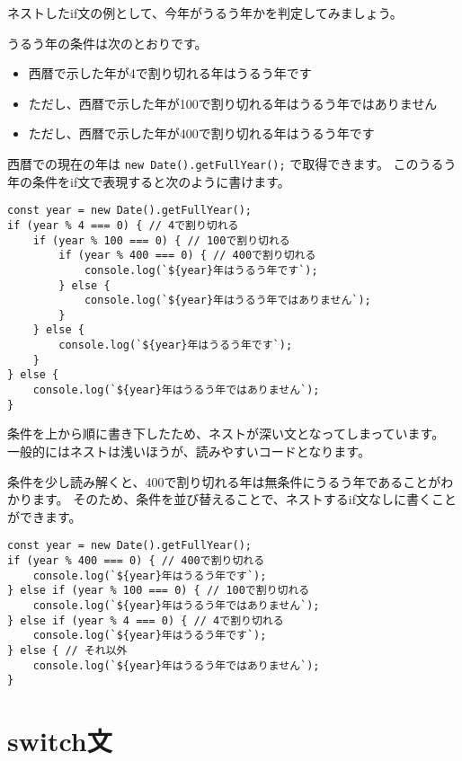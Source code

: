 ネストしたif文の例として、今年がうるう年かを判定してみましょう。

うるう年の条件は次のとおりです。

\begin{itemize}
\item
  西暦で示した年が4で割り切れる年はうるう年です
\item
  ただし、西暦で示した年が100で割り切れる年はうるう年ではありません
\item
  ただし、西暦で示した年が400で割り切れる年はうるう年です
\end{itemize}

西暦での現在の年は \texttt{new Date().getFullYear();}
で取得できます。
このうるう年の条件をif文で表現すると次のように書けます。

\begin{lstlisting}
const year = new Date().getFullYear();
if (year % 4 === 0) { // 4で割り切れる
    if (year % 100 === 0) { // 100で割り切れる
        if (year % 400 === 0) { // 400で割り切れる
            console.log(`${year}年はうるう年です`);
        } else {
            console.log(`${year}年はうるう年ではありません`);
        }
    } else {
        console.log(`${year}年はうるう年です`);
    }
} else {
    console.log(`${year}年はうるう年ではありません`);
}
\end{lstlisting}

条件を上から順に書き下したため、ネストが深い文となってしまっています。
一般的にはネストは浅いほうが、読みやすいコードとなります。

条件を少し読み解くと、400で割り切れる年は無条件にうるう年であることがわかります。
そのため、条件を並び替えることで、ネストするif文なしに書くことができます。

\begin{lstlisting}
const year = new Date().getFullYear();
if (year % 400 === 0) { // 400で割り切れる
    console.log(`${year}年はうるう年です`);
} else if (year % 100 === 0) { // 100で割り切れる
    console.log(`${year}年はうるう年ではありません`);
} else if (year % 4 === 0) { // 4で割り切れる
    console.log(`${year}年はうるう年です`);
} else { // それ以外
    console.log(`${year}年はうるう年ではありません`);
}
\end{lstlisting}

\hypertarget{switch-statement}{%
\section{switch文}\label{switch-statement}}


